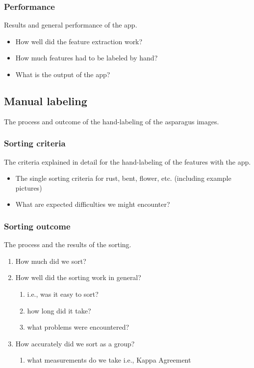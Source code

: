 \subsubsection{Performance}

Results and general performance of the app.

\begin{itemize}
\item How well did the feature extraction work?
\item How much features had to be labeled by hand?
\item What is the output of the app?
\end{itemize}


\subsection{Manual labeling}

The process and outcome of the hand-labeling of the asparagus images.


\subsubsection{Sorting criteria}

The criteria explained in detail for the hand-labeling of the features with the app.

\begin{itemize}
\item The single sorting criteria for rust, bent, flower, etc. (including example pictures)
\item What are expected difficulties we might encounter?
\end{itemize}


\subsubsection{Sorting outcome}

The process and the results of the sorting. 

\begin{enumerate}
\item How much did we sort?
\item How well did the sorting work in general?
\begin{enumerate}
\item i.e., was it easy to sort?
\item how long did it take?
\item what problems were encountered?
\end{enumerate}
\item How accurately did we sort as a group?
\begin{enumerate}
\item what measurements do we take i.e., Kappa Agreement
\end{enumerate}
\end{enumerate}

